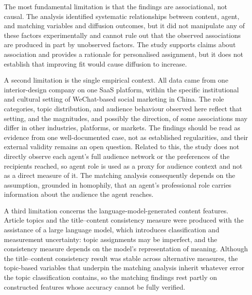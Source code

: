 The most fundamental limitation is that the findings are associational, not causal. The analysis identified systematic relationships between content, agent, and matching variables and diffusion outcomes, but it did not manipulate any of these factors experimentally and cannot rule out that the observed associations are produced in part by unobserved factors. The study supports claims about association and provides a rationale for personalised assignment, but it does not establish that improving fit would cause diffusion to increase.

A second limitation is the single empirical context. All data came from one interior-design company on one SaaS platform, within the specific institutional and cultural setting of WeChat-based social marketing in China. The role categories, topic distribution, and audience behaviour observed here reflect that setting, and the magnitudes, and possibly the direction, of some associations may differ in other industries, platforms, or markets. The findings should be read as evidence from one well-documented case, not as established regularities, and their external validity remains an open question. Related to this, the study does not directly observe each agent's full audience network or the preferences of the recipients reached, so agent role is used as a proxy for audience context and not as a direct measure of it. The matching analysis consequently depends on the assumption, grounded in homophily, that an agent's professional role carries information about the audience the agent reaches.

A third limitation concerns the language-model-generated content features. Article topics and the title–content consistency measure were produced with the assistance of a large language model, which introduces classification and measurement uncertainty: topic assignments may be imperfect, and the consistency measure depends on the model's representation of meaning. Although the title–content consistency result was stable across alternative measures, the topic-based variables that underpin the matching analysis inherit whatever error the topic classification contains, so the matching findings rest partly on constructed features whose accuracy cannot be fully verified.

